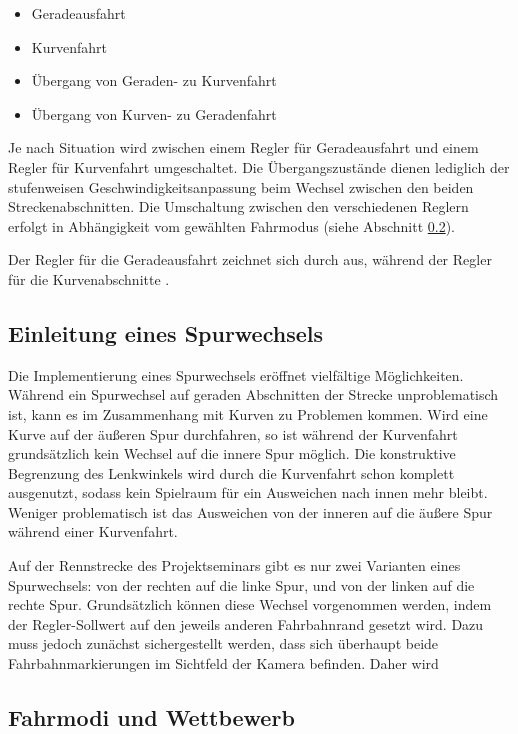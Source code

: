 \begin{itemize}
	\item Geradeausfahrt
	\item Kurvenfahrt
	\item Übergang von Geraden- zu Kurvenfahrt
	\item Übergang von Kurven- zu Geradenfahrt
\end{itemize}

Je nach Situation wird zwischen einem Regler für Geradeausfahrt und einem Regler für Kurvenfahrt umgeschaltet. Die Übergangszustände dienen lediglich der stufenweisen Geschwindigkeitsanpassung beim Wechsel zwischen den beiden Streckenabschnitten. Die Umschaltung zwischen den verschiedenen Reglern erfolgt in Abhängigkeit vom gewählten Fahrmodus (siehe Abschnitt \ref{sec:fahrmodi}).

Der Regler für die Geradeausfahrt zeichnet sich durch  aus, während der Regler für die Kurvenabschnitte .


\subsection{Einleitung eines Spurwechsels}
\label{sec:spurwechsel}

Die Implementierung eines Spurwechsels eröffnet vielfältige Möglichkeiten. Während ein Spurwechsel auf geraden Abschnitten der Strecke unproblematisch ist, kann es im Zusammenhang mit Kurven zu Problemen kommen. Wird eine Kurve auf der äußeren Spur durchfahren, so ist während der Kurvenfahrt grundsätzlich kein Wechsel auf die innere Spur möglich. Die konstruktive Begrenzung des Lenkwinkels wird durch die Kurvenfahrt schon komplett ausgenutzt, sodass kein Spielraum für ein Ausweichen nach innen mehr bleibt. Weniger problematisch ist das Ausweichen von der inneren auf die äußere Spur während einer Kurvenfahrt.

Auf der Rennstrecke des Projektseminars gibt es nur zwei Varianten eines Spurwechsels: von der rechten auf die linke Spur, und von der linken auf die rechte Spur. Grundsätzlich können diese Wechsel vorgenommen werden, indem der Regler-Sollwert auf den jeweils anderen Fahrbahnrand gesetzt wird. Dazu muss jedoch zunächst sichergestellt werden, dass sich überhaupt beide Fahrbahnmarkierungen im Sichtfeld der Kamera befinden. Daher wird 


\subsection{Fahrmodi und Wettbewerb}
\label{sec:fahrmodi}

